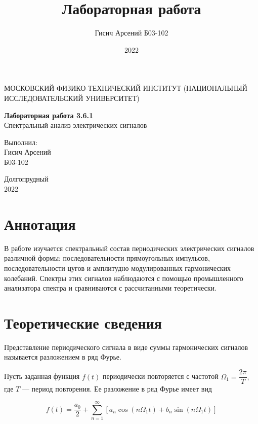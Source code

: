 \documentclass[a4paper, 12pt]{article}
\title{Лабораторная работа}
\author{Гисич Арсений Б03-102}
\date{2022}
\begin{document}
	\begin{center}
		{\large МОСКОВСКИЙ ФИЗИКО-ТЕХНИЧЕСКИЙ ИНСТИТУТ (НАЦИОНАЛЬНЫЙ ИССЛЕДОВАТЕЛЬСКИЙ УНИВЕРСИТЕТ)}
	\end{center}
	\vspace{5 cm}
	{\Large
		\begin{center}
			{\bf Лабораторная работа 3.6.1}\\[0.2 cm]
			Спектральный анализ электрических сигналов
		\end{center}
	}
	\vspace{4 cm}
	\begin{flushright}
		{\Large Выполнил: \\
			\vspace{0.2 cm}
			Гисич Арсений \\
			\vspace{0.2 cm}
			Б03-102 \\}
	\end{flushright}
	\vspace{9 cm}
	\begin{center}
		Долгопрудный\\[0.1 cm]
		2022
	\end{center}
\thispagestyle{empty}

\section{Аннотация}

В работе изучается спектральный состав периодических электрических сигналов различной формы: последовательности прямоугольных импульсов, последовательности цугов и амплитудно модулированных гармонических колебаний. Спектры этих сигналов наблюдаются с помощью промышленного анализатора спектра и сравниваются с рассчитанными теоретически. 

\section{Теоретические сведения}

Представление периодического сигнала в виде суммы гармонических сигналов называется разложением в ряд Фурье.
	
Пусть заданная функция $f(t)$ периодически повторяется с частотой $\Omega_{1}=\dfrac{2\pi}{T},$ где $T$ --- период повторения. Ее разложение в ряд Фурье имеет вид
	
$$ f(t)=\dfrac{a_{0}}{2}+ \sum\limits_{n=1}^\infty [a_{n}\cos(n \Omega_{1}t)+b_{n}\sin(n \Omega_{1} t) ]$$
	
\end{document}
